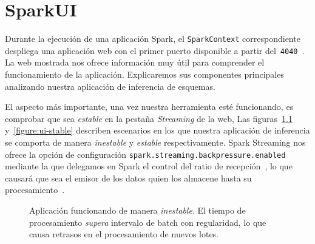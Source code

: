 \chapter{SparkUI\label{spark-ui}}

Durante la ejecución de una aplicación Spark, el \texttt{SparkContext}
correspondiente despliega una aplicación web con el primer puerto
disponible a partir del~\texttt{4040}~\cite{prosparkstreaming}. La web
mostrada nos ofrece información muy útil para comprender el funcionamiento
de la aplicación. Explicaremos sus componentes principales analizando
nuestra aplicación de inferencia de esquemas.

El aspecto más importante, una vez nuestra herramienta esté funcionando, es
comprobar que sea \emph{estable} en la pestaña \emph{Streaming} de la web,
Las figuras~\ref{figure:ui-unstable} y~\ref{figure:ui-stable} describen
escenarios en los que nuestra aplicación de inferencia se comporta de
manera \emph{inestable} y \emph{estable} respectivamente. Spark Streaming
nos ofrece la opción de configuración
\texttt{spark.streaming.backpressure.enabled} mediante la que delegamos en
Spark el control del ratio de recepción~\cite{spark-configuration}, lo que
causará que sea el emisor de los datos quien los almacene hasta su
procesamiento~\cite{mastering-apache-spark}.

\begin{figure}[htb!]
\centering
\caption{Aplicación funcionando de manera \emph{inestable}. El tiempo de
  procesamiento \emph{supera} intervalo de batch con regularidad, lo que
  causa retrasos en el procesamiento de nuevos
  lotes.\label{figure:ui-unstable}}
\end{figure}

